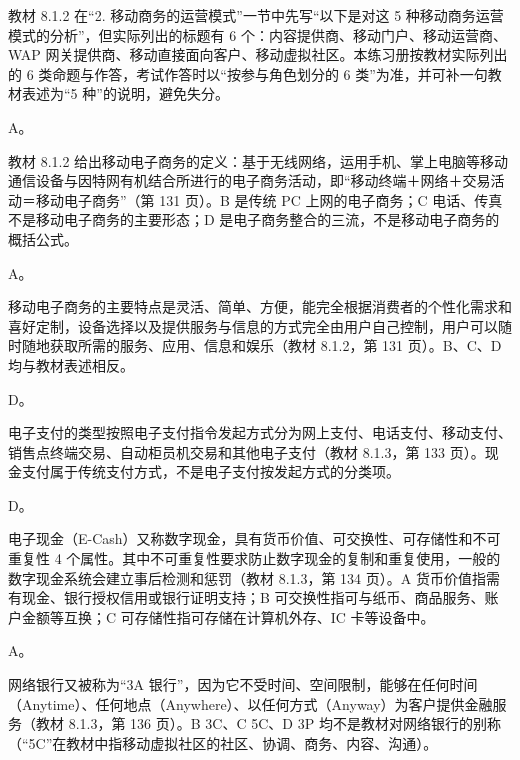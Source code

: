 \documentclass[a4paper,11pt]{article}
\begin{document}

教材 8.1.2 在“2. 移动商务的运营模式”一节中先写“以下是对这 5 种移动商务运营模式的分析”，但实际列出的标题有 6 个：内容提供商、移动门户、移动运营商、WAP 网关提供商、移动直接面向客户、移动虚拟社区。本练习册按教材实际列出的 6 类命题与作答，考试作答时以“按参与角色划分的 6 类”为准，并可补一句教材表述为“5 种”的说明，避免失分。\par\vspace{0.6em}


\q A。\begin{analysis}教材 8.1.2 给出移动电子商务的定义：基于无线网络，运用手机、掌上电脑等移动通信设备与因特网有机结合所进行的电子商务活动，即“移动终端＋网络＋交易活动＝移动电子商务”（第 131 页）。B 是传统 PC 上网的电子商务；C 电话、传真不是移动电子商务的主要形态；D 是电子商务整合的三流，不是移动电子商务的概括公式。\end{analysis}

\q A。\begin{analysis}移动电子商务的主要特点是灵活、简单、方便，能完全根据消费者的个性化需求和喜好定制，设备选择以及提供服务与信息的方式完全由用户自己控制，用户可以随时随地获取所需的服务、应用、信息和娱乐（教材 8.1.2，第 131 页）。B、C、D 均与教材表述相反。\end{analysis}

\q D。\begin{analysis}电子支付的类型按照电子支付指令发起方式分为网上支付、电话支付、移动支付、销售点终端交易、自动柜员机交易和其他电子支付（教材 8.1.3，第 133 页）。现金支付属于传统支付方式，不是电子支付按发起方式的分类项。\end{analysis}

\q D。\begin{analysis}电子现金（E-Cash）又称数字现金，具有货币价值、可交换性、可存储性和不可重复性 4 个属性。其中不可重复性要求防止数字现金的复制和重复使用，一般的数字现金系统会建立事后检测和惩罚（教材 8.1.3，第 134 页）。A 货币价值指需有现金、银行授权信用或银行证明支持；B 可交换性指可与纸币、商品服务、账户金额等互换；C 可存储性指可存储在计算机外存、IC 卡等设备中。\end{analysis}

\q A。\begin{analysis}网络银行又被称为“3A 银行”，因为它不受时间、空间限制，能够在任何时间（Anytime）、任何地点（Anywhere）、以任何方式（Anyway）为客户提供金融服务（教材 8.1.3，第 136 页）。B 3C、C 5C、D 3P 均不是教材对网络银行的别称（“5C”在教材中指移动虚拟社区的社区、协调、商务、内容、沟通）。\end{analysis}
\end{document}
